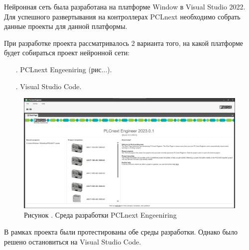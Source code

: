 \subtitlespace

{\gostFont
	
	\par \redline Нейронная сеть была разработана на платформе Window в Visual Studio 2022. Для успешного развертывания на контроллерах PCLnext необходимо собрать данные проекты для данной платформы.
	
	\par \redline При разработке проекта рассматривалось 2 варианта того, на какой платформе будет собираться проект нейронной сети: 
	
	\begin{itemize}[leftmargin=2.15cm, labelwidth=0.65cm, labelsep=0.0cm] 
		
		\item[\theitemcntr. ]	PCLnext Engeeniring (рис.\thechaptercntr.\theimagecntr.).		
		\addtocounter{itemcntr}{1}
		
		\item[\theitemcntr. ] 	Visual Studio Code.
		
		\addtocounter{itemcntr}{1}
		
		\setcounter{itemcntr}{1}
	\end{itemize} 
	
	  \begin{figure}
		\centering
		\def\svgwidth{\textwidth}
		\includegraphics[scale=0.5]{images/pclnext_engineering.jpg}
		\caption*{\gostFont Рисунок \thechaptercntr .\theimagecntr \spc {--} Среда разработки PCLnext Engeeniring}
	\end{figure} 
	\addtocounter{imagecntr}{1}
	
	\par \redline В рамках проекта были протестированы обе среды разработки. Однако было решено остановиться на Visual Studio Code.  
	
}
